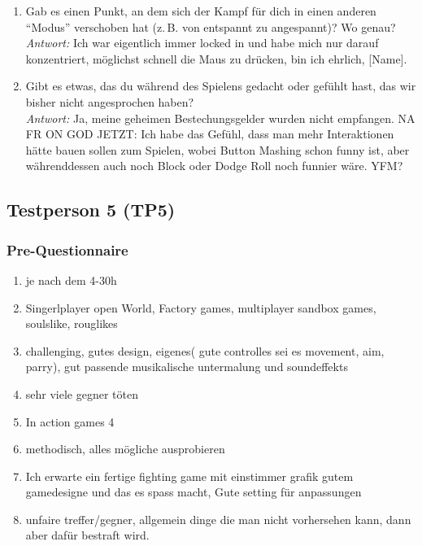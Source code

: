 \documentclass[../Main.tex]{subfiles}
\begin{document}
\begin{enumerate}[label=\textbf{I\arabic*}, leftmargin=1.5cm, itemsep=1em]
\item Gab es einen Punkt, an dem sich der Kampf für dich in einen anderen \enquote{Modus} verschoben hat (z.\,B. von entspannt zu angespannt)? Wo genau? \\
\textit{Antwort:} Ich war eigentlich immer locked in und habe mich nur darauf konzentriert, möglichst schnell die Maus zu drücken, bin ich ehrlich, [Name].

\item Gibt es etwas, das du während des Spielens gedacht oder gefühlt hast, das wir bisher nicht angesprochen haben? \\
\textit{Antwort:} Ja, meine geheimen Bestechungsgelder wurden nicht empfangen. NA FR ON GOD JETZT: Ich habe das Gefühl, dass man mehr Interaktionen hätte bauen sollen zum Spielen, wobei Button Mashing schon funny ist, aber währenddessen auch noch Block oder Dodge Roll noch funnier wäre. YFM?
\end{enumerate}

\subsection{Testperson 5 (TP5)}

\subsubsection{Pre-Questionnaire}

\begin{enumerate}[label=\textbf{P\arabic*}, leftmargin=1.5cm, itemsep=0.5em]
\item je nach dem 4-30h
\item Singerlplayer open World, Factory games, multiplayer sandbox games, soulslike, rouglikes
\item challenging, gutes design, eigenes( gute controlles sei es movement, aim, parry), gut passende musikalische untermalung und soundeffekts
\item sehr viele gegner töten
\item In action games 4
\item methodisch, alles mögliche ausprobieren
\item Ich erwarte ein fertige fighting game mit einstimmer grafik gutem gamedesigne und das es spass macht, Gute setting für anpassungen
\item unfaire treffer/gegner, allgemein dinge die man nicht vorhersehen kann, dann aber dafür bestraft wird.
\end{enumerate}
\end{document}

